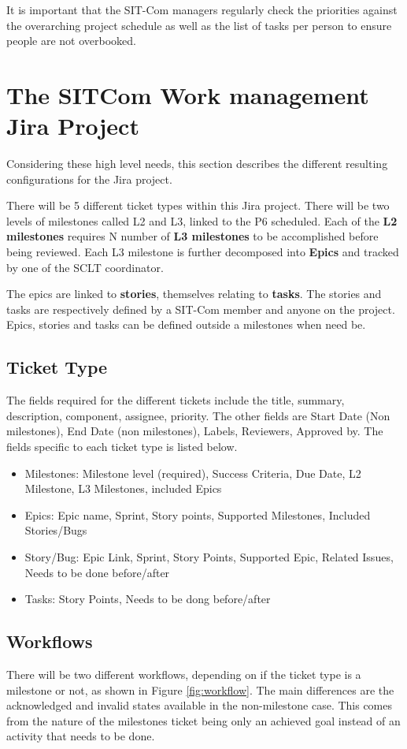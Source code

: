 \documentclass[SE,authoryear,toc]{lsstdoc}
\begin{document}
It is important that the SIT-Com managers regularly check the priorities against the overarching project schedule as well as the list of tasks per person to ensure people are not overbooked. 




\section{The SITCom Work management Jira Project }
Considering these high level needs, this section describes the different resulting configurations for the Jira project. 

There will be 5 different ticket types within this Jira project.
There will be two levels of milestones called L2 and L3, linked to the P6 scheduled. Each of the {\bf L2 milestones} requires N number of {\bf L3 milestones} to be accomplished before being reviewed. Each L3 milestone is further decomposed into {\bf Epics} and tracked by one of the SCLT coordinator. 

The epics are linked to {\bf stories}, themselves relating to {\bf tasks}. The stories and tasks are respectively defined by a SIT-Com member and anyone on the project. 
Epics, stories and tasks can be defined outside a milestones when need be.

\subsection{Ticket Type}
The fields required for the different tickets include the title, summary, description, component, assignee, priority. The other fields are Start Date (Non milestones), End Date (non milestones), Labels, Reviewers, Approved by.  The fields specific to each ticket type is listed below.
\begin{itemize}
\item{Milestones}: Milestone level (required), Success Criteria, Due Date, L2 Milestone, L3 Milestones, included Epics
\item{Epics}: Epic name, Sprint, Story points, Supported Milestones, Included Stories/Bugs
\item{Story/Bug}: Epic Link, Sprint, Story Points, Supported Epic, Related Issues, Needs to be done before/after
\item{Tasks}: Story Points, Needs to be dong before/after
\end{itemize}

\subsection{Workflows}
There will be two different workflows, depending on if the ticket type is a milestone or not, as shown in Figure \ref{fig:workflow}. The main differences are the acknowledged and invalid states available in the non-milestone case.  This comes from the nature of the milestones ticket being only an achieved goal instead of an activity that needs to be done. 
\end{document}
